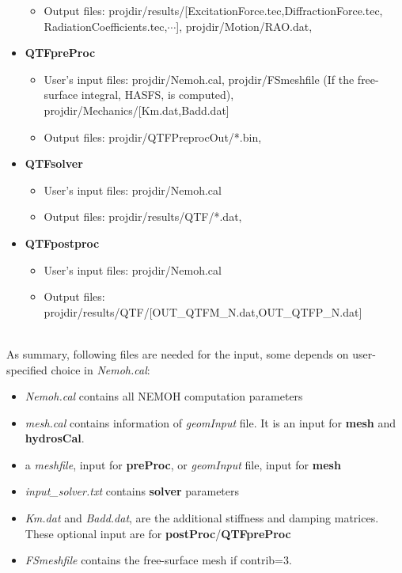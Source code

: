 \documentclass[12pt,a4paper,titlepage]{article}
\begin{document}
\begin{itemize}
\begin{itemize}
\item Output files: projdir/results/[ExcitationForce.tec,DiffractionForce.tec,\\
RadiationCoefficients.tec,$\cdots$], projdir/Motion/RAO.dat,
\end{itemize}
\item \textbf{QTFpreProc}
\begin{itemize}
\item User's input files: projdir/Nemoh.cal, projdir/FSmeshfile (If the free-surface integral, HASFS, is computed), projdir/Mechanics/[Km.dat,Badd.dat]
\item Output files: projdir/QTFPreprocOut/*.bin,
\end{itemize}
\item \textbf{QTFsolver}
\begin{itemize}
\item User's input files: projdir/Nemoh.cal
\item Output files: projdir/results/QTF/*.dat,
\end{itemize}
\item \textbf{QTFpostproc}
\begin{itemize}
\item User's input files: projdir/Nemoh.cal
\item Output files: projdir/results/QTF/[OUT\_QTFM\_N.dat,OUT\_QTFP\_N.dat]
\end{itemize}
\end{itemize}
\ \\
As summary, following files are needed for the input, some depends on user-specified choice in \textit{Nemoh.cal}:
\begin{itemize}
\item \textit{Nemoh.cal} contains all NEMOH computation parameters
\item \textit{mesh.cal} contains information of \textit{geomInput} file. It is an input for \textbf{mesh} and \textbf{hydrosCal}.
\item a \textit{meshfile}, input for \textbf{preProc}, or \textit{geomInput} file, input for \textbf{mesh}
\item  \textit{input\_solver.txt} contains \textbf{solver} parameters
\item \textit{Km.dat} and \textit{Badd.dat}, are the additional stiffness and damping matrices. These optional input are for \textbf{postProc}/\textbf{QTFpreProc}
\item \textit{FSmeshfile} contains the free-surface mesh if contrib=3.
\end{itemize}
\end{document}
